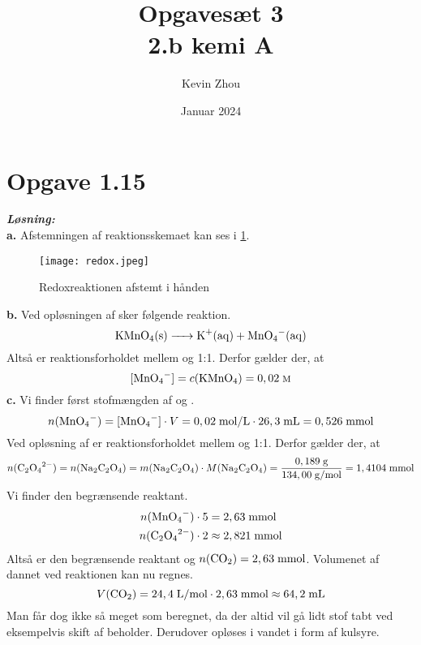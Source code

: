 \documentclass{report}
\title{Opgavesæt 3\\
{\Large \textbf{2.b kemi A}}}
\author{Kevin Zhou}
\date{Januar 2024}
\newcommand{\sol}{\setlength{\parindent}{0cm}\textbf{\textit{Løsning:}}\setlength{\parindent}{1cm}}
\begin{document}
\maketitle
\section*{Opgave 1.15}
\sol \\
\textbf{a.} Afstemningen af reaktionsskemaet kan ses i \cref{fig:redox}.
\begin{figure}[H]
\begin{center}
  \texttt{[image: redox.jpeg]}
\end{center}
\caption{Redoxreaktionen afstemt i hånden}
\label{fig:redox}
\end{figure}
\noindent \textbf{b.} 
Ved opløsningen af  sker følgende reaktion.
\[
\ce{KMnO4(s) -> K+(aq) + MnO4-(aq)}
\] 
Altså er reaktionsforholdet mellem  og  1:1.
Derfor gælder der, at
\[
[\ce{MnO4-}] = c(\ce{KMnO4})=0,02 \;\textsc{m}
\] 
\textbf{c.} Vi finder først stofmængden af  og .
\[
n(\ce{MnO4-})=[\ce{MnO4-}]\cdot V=0,02 \;\unit{mol/L} \cdot 26,3 \;\unit{mL} = 0,526 \;\unit{mmol} 
\] 
Ved opløsning af  er reaktionsforholdet mellem  og  1:1.
Derfor gælder der, at
\[
n(\ce{C2O4^2-}) = n(\ce{Na2C2O4}) = m(\ce{Na2C2O4}) \cdot M(\ce{Na2C2O4})=\frac{0,189 \;\unit{g}}{134,00 \;\unit{g/mol} } = 1,4104\;\unit{mmol} 
\] 
Vi finder den begrænsende reaktant.
\begin{equation*}
\begin{split}
  n(\ce{MnO4-})\cdot 5 &=2,63 \;\unit{mmol} \\
  n(\ce{C2O4^2-}) \cdot 2 &\approx 2,821 \;\unit{mmol} 
\end{split}
\end{equation*}
Altså er  den begrænsende reaktant og $n(\ce{CO2})=2,63 \;\unit{mmol} $.
Volumenet af  dannet ved reaktionen kan nu regnes.
\[
V(\ce{CO2} )=24,4 \;\unit{L/mol} \cdot 2,63 \;\unit{mmol} \approx 64,2 \;\unit{mL}  
\] 
Man får dog ikke så meget  som beregnet, da der altid vil gå lidt stof tabt ved eksempelvis skift af beholder.
Derudover opløses   i vandet i form af kulsyre.
\end{document}
